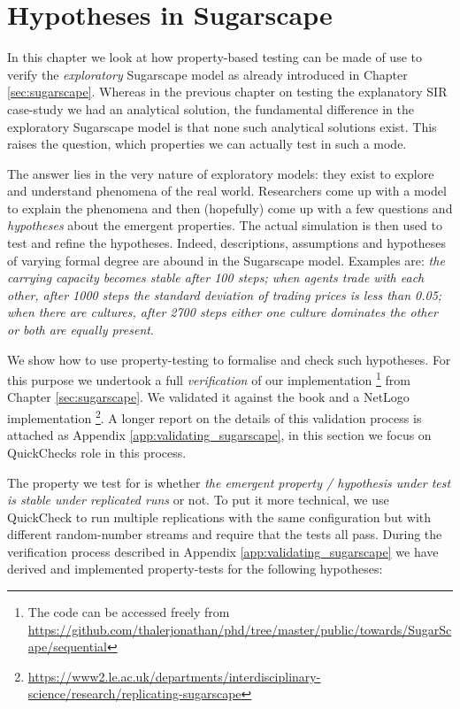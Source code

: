 \section{Hypotheses in Sugarscape}
\label{ch:prop_exploratory}

In this chapter we look at how property-based testing can be made of use to verify the \textit{exploratory} Sugarscape model \cite{epstein_growing_1996} as already introduced in Chapter \ref{sec:sugarscape}. Whereas in the previous chapter on testing the explanatory SIR case-study we had an analytical solution, the fundamental difference in the exploratory Sugarscape model is that none such analytical solutions exist. This raises the question, which properties we can actually test in such a mode.

The answer lies in the very nature of exploratory models: they exist to explore and understand phenomena of the real world. Researchers come up with a model to explain the phenomena and then (hopefully) come up with a few questions and  \textit{hypotheses} about the emergent properties. The actual simulation is then used to test and refine the hypotheses. Indeed, descriptions, assumptions and hypotheses of varying formal degree are abound in the Sugarscape model. Examples are: \textit{the carrying capacity becomes stable after 100 steps; when agents trade with each other, after 1000 steps the standard deviation of trading prices is less than 0.05; when there are cultures, after 2700 steps either one culture dominates the other or both are equally present}. 

We show how to use property-testing to formalise and check such hypotheses. For this purpose we undertook a full \textit{verification} of our implementation \footnote{The code can be accessed freely from \url{https://github.com/thalerjonathan/phd/tree/master/public/towards/SugarScape/sequential}} from Chapter \ref{sec:sugarscape}. We validated it against the book \cite{epstein_growing_1996} and a NetLogo implementation \cite{weaver_replicating_2009} \footnote{\url{https://www2.le.ac.uk/departments/interdisciplinary-science/research/replicating-sugarscape}}. A longer report on the details of this validation process is attached as Appendix \ref{app:validating_sugarscape}, in this section we focus on QuickChecks role in this process.

The property we test for is whether \textit{the emergent property / hypothesis under test is stable under replicated runs} or not. To put it more technical, we use QuickCheck to run multiple replications with the same configuration but with different random-number streams and require that the tests all pass. During the verification process described in Appendix \ref{app:validating_sugarscape} we have derived and implemented property-tests for the following hypotheses:

